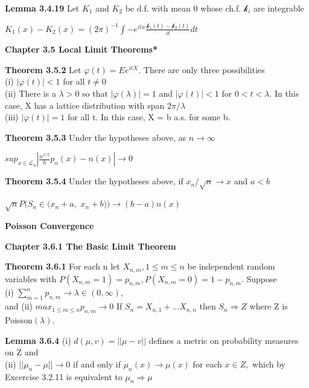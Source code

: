 \documentclass{article}
\begin{document}
\textbf {Lemma 3.4.19} Let $K_1$ and $K_2$ be d.f. with mean 0 whose ch.f. $\mathcal{k}_i$ are integrable
\begin{center}
$K_1(x) - K_2(x) = (2\pi)^{-1} \int -e^{itx} \frac{\mathcal{k}_1(t) - \mathcal{k}_2(t)}{it} dt$
\end{center}

\textbf {Chapter 3.5 Local Limit Theorems*}

\textbf {Theorem 3.5.2} Let $\varphi(t) = Ee^{itX}$. There are only three possibilities \\
(i) $|\varphi(t)| < 1$ for all $t \neq 0$ \\
(ii) There is a $\lambda > 0$ so that $|\varphi(\lambda)| = 1$ and $|\varphi(t)| < 1$ for $0 < t < \lambda$. In this case, X has a lattice distribution with span $2\pi / \lambda$ \\
(iii) $|\varphi(t)| = 1$ for all t. In this case, X = b a.s. for some b.

\textbf {Theorem 3.5.3} Under the hypotheses above, as $n \to \infty$
\begin{center}
$sup_{x \in \mathcal{L}_n }|\frac{n^{1/2}}{h} p_n (x) - n(x)| \rightarrow 0$
\end{center}

\textbf {Theorem 3.5.4} Under the hypotheses above, if $x_n / \sqrt{n} \to x$ and $a < b$
\begin{center}
$\sqrt{n} P(S_n \in (x_n + a,$ $x_n + b)) \rightarrow (b-a)n(x)$
\end{center}

\textbf {Poisson Convergence}

\textbf {Chapter 3.6.1 The Basic Limit Theorem}

\textbf {Theorem 3.6.1} For each n let $X_{n,m}, 1 \leq m \leq n$ be independent random variables with $P(X_{n,m} = 1) = p_{n,m}, P(X_{n,m} = 0) = 1 - p_{n,m}.$ Suppose \\
(i) $\sum_{m=1}^n p_{n,m} \rightarrow \lambda \in (0, \infty)$, \\
and (ii) $max_{1 \leq m \leq n} p_{n,m} \rightarrow 0$
If $S_n = X_{n,1} + \dots X_{n,n}$ then $S_n \Rightarrow Z$ where Z is Poisson$(\lambda)$.

\textbf {Lemma 3.6.4} (i) $d(\mu, v) = ||\mu - v||$ defines a metric on probability measures on Z and \\
(ii) $||\mu_n - \mu|| \rightarrow 0$ if and only if $\mu_n (x) \rightarrow \mu(x)$ for each $x \in Z,$ which by Excercise 3.2.11 is equivalent to $\mu_n \Rightarrow \mu$
\end{document}
